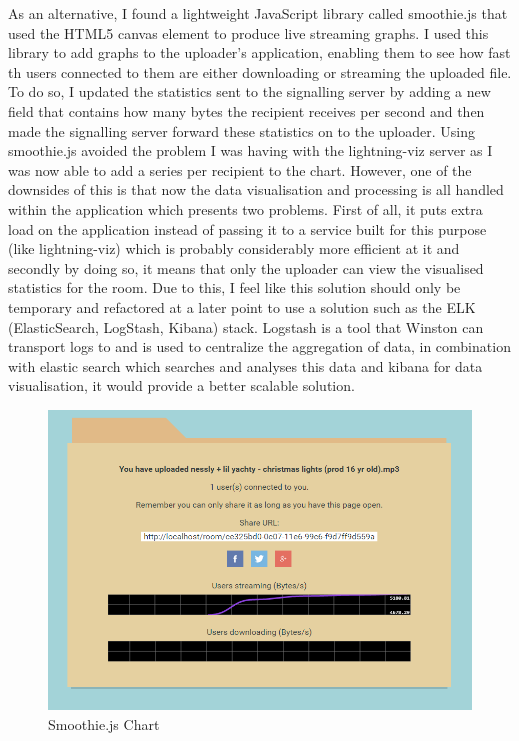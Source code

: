 \documentclass[]{report}
\begin{document}
				As an alternative, I found a lightweight JavaScript library called smoothie.js that used the HTML5 canvas element to produce live streaming graphs. I used this library to add graphs to the uploader's application, enabling them to see how fast th users connected to them are either downloading or streaming the uploaded file. To do so, I updated the statistics sent to the signalling server by adding a new field that contains how many bytes the recipient receives per second and then made the signalling server forward these statistics on to the uploader. Using smoothie.js avoided the problem I was having with the lightning-viz server as I was now able to add a series per recipient to the chart. However, one of the downsides of this is that now the data visualisation and processing is all handled within the application which presents two problems. First of all, it puts extra load on the application instead of passing it to a service built for this purpose (like lightning-viz) which is probably considerably more efficient at it and secondly by doing so, it means that only the uploader can view the visualised statistics for the room. Due to this, I feel like this solution should only be temporary and refactored at a later point to use a solution such as the ELK (ElasticSearch, LogStash, Kibana) stack. Logstash is a tool that Winston can transport logs to and is used to centralize the aggregation of data, in combination with elastic search which searches and analyses this data and kibana for data visualisation, it would provide a better scalable solution.
				
				\begin{figure}[H]
					\caption{Smoothie.js Chart}
					\centering
					\includegraphics[scale=0.5]{smoothie-js.png}
				\end{figure}
			
\end{document}
